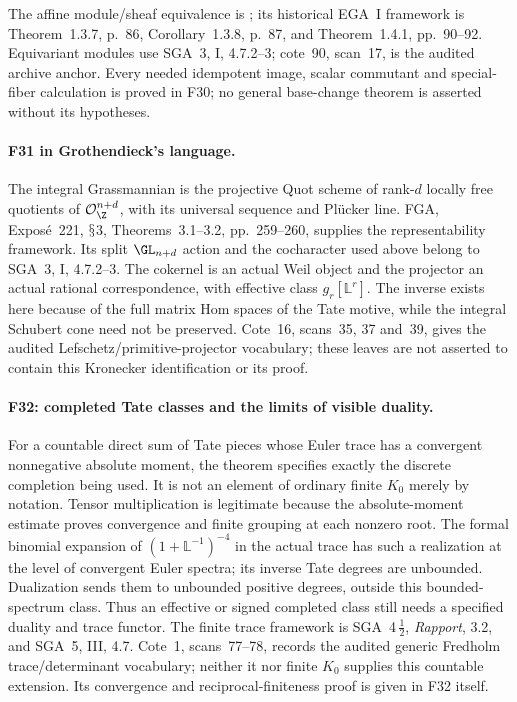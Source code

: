 \documentclass[11pt,a4paper]{article}
\renewcommand{\S}{\ensuremath{\mathsection}}
\newcommand{\fid}[1]{\textsf{#1}}\newcommand{\gate}[1]{\textsf{#1}}
\theoremstyle{named}\newtheorem{finding}{Finding}[section]
\theoremstyle{definition}\newtheorem{definition}[finding]{Definition}
\theoremstyle{remark}\newtheorem{remark}[finding]{Remark}
\begin{document}
The affine module/sheaf equivalence is
\cite[Lemma~26.7.5, tag~01IB]{StacksAffine}; its historical
EGA~I framework is Theorem~1.3.7, p.~86, Corollary~1.3.8,
p.~87, and Theorem~1.4.1, pp.~90--92. Equivariant modules use
SGA~3, I, 4.7.2--3; cote~90,
scan~17, is the audited archive anchor. Every needed idempotent
image, scalar commutant and special-fiber calculation is proved
in \fid{F30}; no general base-change theorem is asserted without
its hypotheses.

\paragraph{\fid{F31} in Grothendieck's language.}
The integral Grassmannian is the projective Quot scheme of
rank-$d$ locally free quotients of $\mathcal O_{\Z}^{n+d}$,
with its universal sequence and Pl\"ucker line. FGA, Expos\'e~221,
\S3, Theorems~3.1--3.2, pp.~259--260, supplies the representability
framework. Its split $\GL_{n+d}$ action and the cocharacter used
above belong to SGA~3, I, 4.7.2--3. The cokernel is an actual
Weil object and the projector an actual rational correspondence,
with effective class $g_r[\mathbb L^r]$. The inverse exists here
because of the full matrix Hom spaces of the Tate motive, while
the integral Schubert cone need not be preserved. Cote~16,
scans~35, 37 and~39, gives the audited Lefschetz/primitive-projector
vocabulary; these leaves are not asserted to contain this
Kronecker identification or its proof.


\paragraph{\fid{F32}: completed Tate classes and the limits of visible duality.}
For a countable direct sum of Tate pieces whose Euler trace has a
convergent nonnegative absolute moment, the theorem specifies exactly
the discrete completion being used. It is not an element of ordinary
finite $K_0$ merely by notation. Tensor multiplication is legitimate
because the absolute-moment estimate proves convergence and finite
grouping at each nonzero root. The formal binomial expansion of
$(1+\mathbb L^{-1})^{-4}$ in the actual trace has such a realization
at the level of convergent Euler spectra; its inverse Tate degrees
are unbounded. Dualization sends them to unbounded positive degrees,
outside this bounded-spectrum class. Thus an effective or signed
completed class still needs a specified duality and trace functor.
The finite trace framework is SGA~4\,$\frac12$, \emph{Rapport},
3.2, and SGA~5, III, 4.7. Cote~1, scans~77--78, records the
audited generic Fredholm trace/determinant vocabulary; neither it
nor finite $K_0$ supplies this countable extension. Its convergence
and reciprocal-finiteness proof is given in \fid{F32} itself.
\end{document}
